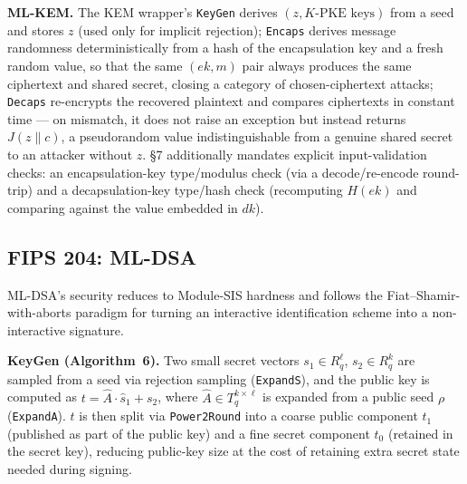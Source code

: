 \documentclass[10pt,conference]{IEEEtran}
\begin{document}
\textbf{ML-KEM.} The KEM wrapper's \texttt{KeyGen} derives $(z, K\text{-PKE
keys})$ from a seed and stores $z$ (used only for implicit rejection);
\texttt{Encaps} derives message randomness deterministically from a hash
of the encapsulation key and a fresh random value, so that the same
$(ek, m)$ pair always produces the same ciphertext and shared secret,
closing a category of chosen-ciphertext attacks; \texttt{Decaps}
re-encrypts the recovered plaintext and compares ciphertexts in constant
time --- on mismatch, it does not raise an exception but instead returns
$J(z \| c)$, a pseudorandom value indistinguishable from a genuine shared
secret to an attacker without $z$. \S7 additionally mandates explicit
input-validation checks: an encapsulation-key type/modulus check (via a
decode/re-encode round-trip) and a decapsulation-key type/hash check
(recomputing $H(ek)$ and comparing against the value embedded in $dk$).

\subsection{FIPS 204: ML-DSA}

ML-DSA's security reduces to Module-SIS hardness and follows the
Fiat--Shamir-with-aborts paradigm for turning an interactive
identification scheme into a non-interactive signature.

\textbf{KeyGen (Algorithm~6).} Two small secret vectors $s_1 \in R_q^\ell$,
$s_2 \in R_q^k$ are sampled from a seed via rejection sampling
(\texttt{ExpandS}), and the public key is computed as
$t = \hat A \cdot \hat s_1 + s_2$, where $\hat A \in T_q^{k \times \ell}$
is expanded from a public seed $\rho$ (\texttt{ExpandA}). $t$ is then
split via \texttt{Power2Round} into a coarse public component $t_1$
(published as part of the public key) and a fine secret component $t_0$
(retained in the secret key), reducing public-key size at the cost of
retaining extra secret state needed during signing.
\end{document}
